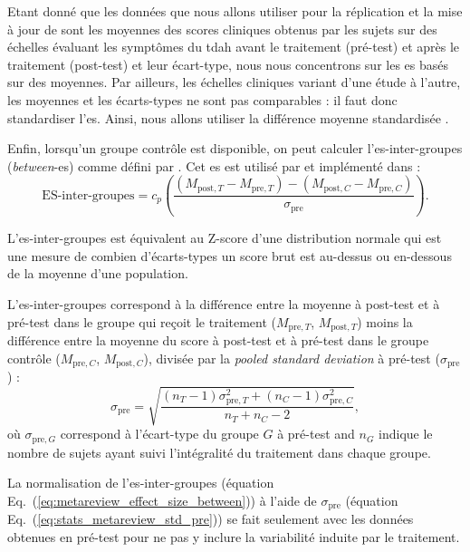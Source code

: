 Etant donné que les données que nous allons utiliser pour la réplication et la mise à jour de \citet{Cortese2016} sont les moyennes des 
scores cliniques obtenus par les sujets sur des échelles évaluant les symptômes du \gls{tdah} avant le traitement (pré-test) et 
après le traitement (post-test) et leur écart-type, nous nous concentrons sur 
les \gls{es} basés sur des moyennes. Par ailleurs, les échelles cliniques variant 
d'une étude à l'autre, les moyennes et les écarts-types ne sont pas comparables : il faut donc standardiser l'\gls{es}. 
Ainsi, nous allons utiliser la différence moyenne standardisée \citep{Cortese2016, Micoulaud2014}.

Enfin, lorsqu'un groupe contrôle est disponible, on peut calculer l'\gls{es}-inter-groupes (\textit{between}-\gls{es}) comme défini par \citet{Morris2008}.
Cet \gls{es} est utilisé par \citet{Cortese2016, Micoulaud2014} et implémenté dans \citet{Bussalb2019clinical} :
\begin{equation}
\label{eq:metareview_effect_size_between}
\text{ES-inter-groupes} = c_p \left(\frac{(M_{\text{post},T} - M_{\text{pre},T}) - (M_{\text{post},C} - M_{\text{pre},C}) }{\sigma_{\text{pre}}} \right).
\end{equation} 

L'\gls{es}-inter-groupes est équivalent au Z-score d'une distribution normale qui est une mesure de combien d'écarts-types un score brut est au-dessus ou en-dessous
de la moyenne d'une population. 

L'\gls{es}-inter-groupes correspond à la différence entre la moyenne à post-test et à pré-test 
dans le groupe qui reçoit le traitement ($M_{\text{pre},T}$, $M_{\text{post},T}$) moins la différence entre la moyenne du score à post-test et à pré-test 
dans le groupe contrôle ($M_{\text{pre},C}$, $M_{\text{post},C}$), divisée par la \textit{pooled standard deviation} à pré-test ($\sigma_{\text{pre}}$) :
\begin{equation}
\label{eq:stats_metareview_std_pre}
\sigma_{\text{pre}} = \sqrt{\frac{(n_T - 1)\sigma_{\text{pre},T}^2 + (n_C - 1)\sigma_{\text{pre},C}^2} {n_T + n_C - 2}},
\end{equation}
où $\sigma_{\text{pre},G}$ correspond à l'écart-type du groupe $G$ à pré-test and $n_G$ indique le nombre de sujets ayant suivi l'intégralité 
du traitement dans chaque groupe.

La normalisation de l'\gls{es}-inter-groupes (équation Eq.~(\ref{eq:metareview_effect_size_between})) à l'aide de $\sigma_{\text{pre}}$ 
(équation Eq.~(\ref{eq:stats_metareview_std_pre})) se fait seulement avec les données obtenues en pré-test pour ne pas y inclure la variabilité 
induite par le traitement.

